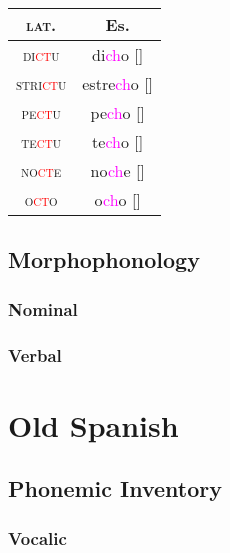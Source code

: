 \documentclass{report}
\begin{document}
\begin{tcolorbox}[title=Palatalization of cluster /kt/]

\end{tcolorbox}

\begin{tabular}{c c}
  \textsc{lat.} & Es. \\
  \hline
  \textsc{di\textcolor{red}{ct}u} & di\textcolor{magenta}{ch}o [\textipa{\textteshlig}] \\
  \textsc{stri\textcolor{red}{ct}u} & estre\textcolor{magenta}{ch}o [\textipa{\textteshlig}] \\
  \textsc{pe\textcolor{red}{ct}u} & pe\textcolor{magenta}{ch}o [\textipa{\textteshlig}] \\
  \textsc{te\textcolor{red}{ct}u} & te\textcolor{magenta}{ch}o [\textipa{\textteshlig}] \\
  \textsc{no\textcolor{red}{ct}e} & no\textcolor{magenta}{ch}e [\textipa{\textteshlig}] \\
  \textsc{o\textcolor{red}{ct}o} & o\textcolor{magenta}{ch}o [\textipa{\textteshlig}] \\
\end{tabular}

\section{Morphophonology}

\subsection{Nominal}

\subsection{Verbal}

\chapter{Old Spanish}


\section{Phonemic Inventory}

\subsection{Vocalic}
\end{document}
